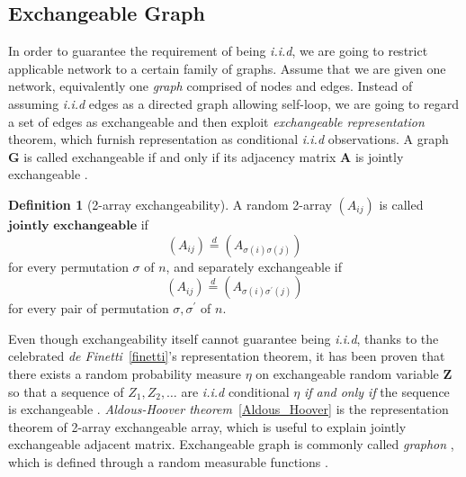 \documentclass[12pt]{article}
\theoremstyle{definition}
\newtheorem{definition}{Definition}[section]
\begin{document}
\subsection{Exchangeable Graph}

 In order to guarantee the requirement of being \textit{i.i.d}, we are going to restrict applicable network to a certain family of graphs. Assume that we are given one network, equivalently one \textit{graph} comprised of nodes and edges. Instead of assuming \textit{i.i.d} edges as a directed graph allowing self-loop, we are going to regard a set of edges as exchangeable and then exploit \textit{exchangeable representation} theorem, which furnish representation as conditional \textit{i.i.d} observations. A graph $\mathbf{G}$ is called exchangeable if and only if its adjacency matrix $\mathbf{A}$ is jointly exchangeable \citep{orbanz2015bayesian}. 
	
\begin{definition}[2-array exchangeability]
	\label{exchangeability}
	A random 2-array $(A_{ij})$ is called $\mathbf{\mbox{jointly exchangeable}}$ if 
	$$(A_{ij}) \stackrel{d}{=} (A_{\sigma(i) \sigma(j)})$$
	for every permutation $\sigma$ of $n$,
	and separately exchangeable if 
	$$(A_{ij}) \stackrel{d}{=} (A_{\sigma(i) \sigma^{\prime}(j) })$$
	for every pair of permutation $\sigma, \sigma^{\prime}$ of $n$.
\end{definition}
Even though exchangeability itself cannot guarantee being \textit{i.i.d}, thanks to the celebrated  \textit{de Finetti}~\ref{finetti}'s representation theorem, it has been proven that there exists a random probability measure $\eta$ on exchangeable random variable $\mathbf{Z}$ so that a sequence of $Z_{1}, Z_{2}, \ldots $ are \textit{i.i.d} conditional $\eta$ \textit{if and only if} the sequence is exchangeable \citep{orbanz2015bayesian, caron2014sparse}. \textit{Aldous-Hoover theorem}~\ref{Aldous_Hoover} is the representation theorem of 2-array exchangeable array, which is useful to explain jointly exchangeable adjacent matrix. Exchangeable graph is commonly called \textit{graphon} \citep{lovasz2006limits}, which is defined through a random measurable functions \citep{chan2013estimation}.
	
\end{document}
